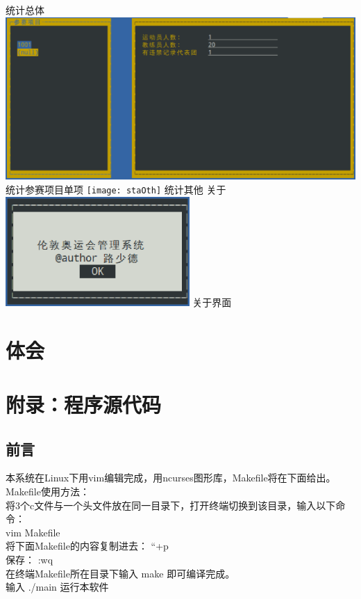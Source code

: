 \documentclass[10pt,a4paper]{article}
\begin{document}
\newline
统计总体
\newline
\includegraphics[width=14cm]{staSig}
\newline
统计参赛项目单项
\newline
\texttt{[image: staOth]}
\newline
统计其他
 关于 \\
\includegraphics[width=7cm]{about}
\newline
关于界面
\newline

\newpage
\section{体会}
\newpage
\section{附录：程序源代码}
\subsection{前言}
本系统在Linux下用vim编辑完成，用ncurses图形库，Makefile将在下面给出。\\
Makefile使用方法：\\
将3个c文件与一个头文件放在同一目录下，打开终端切换到该目录，输入以下命令：\\
vim Makefile \\
将下面Makefile的内容复制进去： ``+p\\
保存： :wq \\ 
在终端Makefile所在目录下输入 make 即可编译完成。\\
输入 ./main 运行本软件\\
\end{document}

